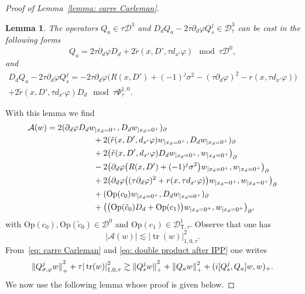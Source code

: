 \documentclass[10pt]{amsart}
\theoremstyle{plain}
\newtheorem{lemma}[theorem]{Lemma}
\theoremstyle{definition}
\let \Re \relax
\DeclareMathOperator{\Re}{Re}
\newcommand{\inp}[2]{(#1, #2)}
\newcommand{\biginp}[2]{\big(#1, #2 \big)}
\newcommand{\br}{\ensuremath{_{|x_d=0^+}}}
\newcommand{\Op}{\ensuremath{\mathrm{Op}}}
\newcommand{\Norm}[2]{{\| #1 \|}_{#2}}
\newcommand{\normsc}[2]{{| #1 |}_{#2, \tau}}
\newcommand{\Psisc}{\Psi_\tau}
\newcommand{\Dsc}{\mathscr{D}_{\tau}}
\newcommand{\Dsct}{\mathscr{D}_{{\scriptscriptstyle{\mathsf T}},\tau}}
\newcommand{\Qconj}{Q_{\sigma,\varphi}}
\newcommand{\Qs}{Q_{s}}
\newcommand{\Qa}{Q_{a}}
\DeclareMathOperator{\trace}{tr}
\begin{document}
\begin{proof}[Proof of Lemma~\ref{lemma: carre Carleman}]
\begin{lemma}
\label{lemma: quadratic form at the boundary}
The operators $\Qa \in \tau \mathscr D^1$ and $D_d\Qa-2\tau \partial_d\varphi
\Qs^j \in
\Dsc^3$ can be cast in the following forms
\begin{equation*}
\Qa = 2 \tau \partial_d\varphi D_d + 2 \tilde{r} (x,D',\tau d_{x'}\varphi)
\mod \tau \mathscr D^0,
\end{equation*}
and
\begin{multline*}
D_d \Qa-2\tau \partial_d\varphi \Qs^j= - 2 \tau \partial_d\varphi
\big(R(x,D') + (-1)^j\sigma^2
-(\tau\partial_d\varphi)^2-r(x,\tau d_{x'}\varphi) \big)\\
+ 2 \tilde{r} (x,D',\tau d_{x'} \varphi) D_d
\mod \tau \Psisc^{1,0}.
\end{multline*}
\end{lemma}
With this lemma we find
\begin{equation}\label{mb0}
\begin{split}
\mathcal{A}(w) &=2 \inp{\partial_d\varphi D_d w\br}{D_dw\br}_\partial\\
&\hspace*{2cm} + 2 \inp{\tilde{r} (x,D', d_{x'}\varphi) w\br}{D_dw\br}_\partial\\
& \hspace*{2cm} + 2 \biginp{ \tilde{r} (x,D', d_{x'} \varphi) D_d
w\br}{w\br}_\partial\\
&\hspace*{2cm} - 2 \biginp{ \partial_d\varphi
\big(R(x,D') +(-1)^j \sigma^2\big)
w\br}{w\br}_\partial\\
&\hspace*{2cm} + 2 \biginp{ \partial_d\varphi
\big((\tau\partial_d\varphi)^2+r(x,\tau d_{x'}\varphi)\big)
w\br}{w\br}_\partial\\
& \hspace*{2cm}
+ \inp{\Op(c_0) w\br}{ D_dw\br}_\partial\\
& \hspace*{2cm}+ \biginp{ \big(\Op(\tilde{c}_0) D_d+ \Op(c_1)\big) w\br}{w\br}_\partial,
\end{split}
\end{equation}
with $\Op(c_0), \Op(\tilde{c}_0) \in \mathscr D^0$ and $\Op(c_1) \in \Dsct^1$.
Observe that one has
\begin{equation}\label{nn1}
|\mathcal{A}(w)|\lesssim \normsc{\trace(w)}{1,0}^2.
\end{equation}
From~\eqref{eq: carre Carleman} and \eqref{eq: double product after IPP} one writes
\begin{equation}
\label{eq: carre Carleman-bis}
\Norm{\Qconj^j w}{+}^2 + \tau \normsc{\trace(w)}{1,0}^2
\gtrsim \Norm{\Qs^j w}{+}^2 +\Norm{\Qa w}{+}^2
+\Re \inp{i [\Qs^j,\Qa]w}{w}_+.
\end{equation}
We now use the following lemma whose proof is given below.


\end{proof}
\end{document}
